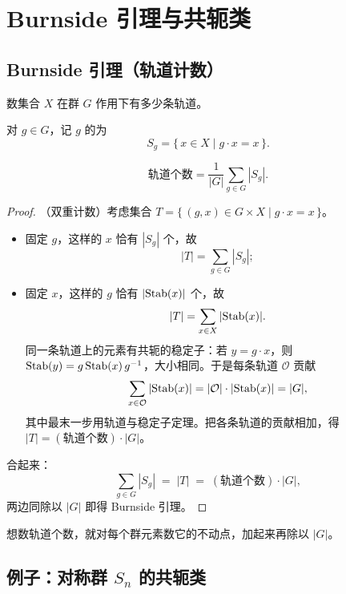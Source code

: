 \section{Burnside 引理与共轭类}\label{sec:burnside}

\subsection{Burnside 引理（轨道计数）}

数集合 $X$ 在群 $G$ 作用下有多少条轨道。

对 $g\in G$，记 $g$ 的为
\[
  S_g = \{\,x\in X \mid g\cdot x = x\,\}.
\]

\begin{theorem}[Burnside 引理]
\[
  \text{轨道个数} = \frac{1}{|G|}\sum_{g\in G} |S_g|.
\]
\end{theorem}

\begin{proof}
（双重计数）考虑集合 $T = \{\,(g,x)\in G\times X \mid g\cdot x = x\,\}$。
\begin{itemize}[leftmargin=1.3em,itemsep=2pt]
  \item {}固定 $g$，这样的 $x$ 恰有 $|S_g|$ 个，故
        \[
          |T| = \sum_{g\in G}|S_g|;
        \]
  \item {}固定 $x$，这样的 $g$ 恰有 $|\mathrm{Stab}(x)|$ 个，故
        \[
          |T| = \sum_{x\in X}|\mathrm{Stab}(x)|.
        \]
        同一条轨道上的元素有共轭的稳定子：若 $y = g\cdot x$，则
        $\mathrm{Stab}(y) = g\,\mathrm{Stab}(x)\,g^{-1}$，大小相同。于是每条轨道
        $\mathcal{O}$ 贡献
        \[
          \sum_{x\in\mathcal{O}}|\mathrm{Stab}(x)|
          = |\mathcal{O}|\cdot|\mathrm{Stab}(x)|
          = |G|,
        \]
        其中最末一步用轨道与稳定子定理。把各条轨道的贡献相加，得
        $|T| = (\text{轨道个数})\cdot|G|$。
\end{itemize}
合起来：
\[
  \sum_{g\in G}|S_g| \;=\; |T| \;=\; (\text{轨道个数})\cdot|G|,
\]
两边同除以 $|G|$ 即得 Burnside 引理。
\end{proof}

\begin{remark}[用法]
想数轨道个数，就对每个群元素数它的不动点，加起来再除以 $|G|$。
\end{remark}

\subsection{例子：对称群 $S_n$ 的共轭类}

